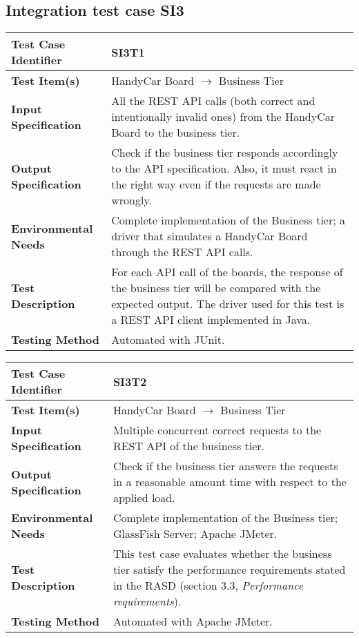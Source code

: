 \vspace{2em}

\subsection{Integration test case SI3}
\label{sec:performance-business}

\begin{tabular}{l p{}}
    \hline
    \textbf{Test Case Identifier} & SI3T1\\
    \hline
    \textbf{Test Item(s)} & HandyCar Board $\rightarrow$ Business Tier\\
    \hline
    \textbf{Input Specification} & All the REST API calls (both correct and intentionally invalid ones) from the HandyCar Board to the business tier.\\
    \hline
    \textbf{Output Specification} & Check if the business tier responds accordingly to the API specification. Also, it must react in the right way even if the requests are made wrongly.\\
    \hline
    \textbf{Environmental Needs} & Complete implementation of the Business tier; a driver that simulates a HandyCar Board through the REST API calls. \\
    \hline
    \textbf{Test Description} & For each API call of the boards, the response of the business tier will be compared with the expected output. The driver used for this test is a REST API client implemented in Java.\\
    \hline
    \textbf{Testing Method} & Automated with JUnit.\\
    \hline
\end{tabular}

\vspace{2em}

\noindent\begin{tabular}{l p{}}
    \hline
    \textbf{Test Case Identifier} & SI3T2\\
    \hline
    \textbf{Test Item(s)} & HandyCar Board $\rightarrow$ Business Tier\\
    \hline
    \textbf{Input Specification} & Multiple concurrent correct requests to the REST API of the business tier.\\
    \hline
    \textbf{Output Specification} & Check if the business tier answers the requests in a reasonable amount time with respect to the applied load. \\
    \hline
    \textbf{Environmental Needs} & Complete implementation of the Business tier; GlassFish Server; Apache JMeter.\\
    \hline
    \textbf{Test Description} & This test case evaluates whether the business tier satisfy the performance requirements stated in the RASD (section 3.3, \emph{Performance requirements}).\\
    \hline
    \textbf{Testing Method} & Automated with Apache JMeter. \\
    \hline
\end{tabular}